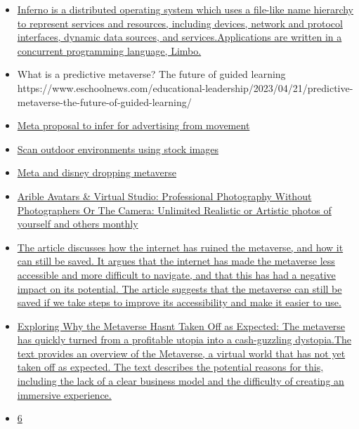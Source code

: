 \begin{itemize}
\item
  \href{https://github.com/inferno-os/inferno-os}{Inferno is a
  distributed operating system which uses a file-like name hierarchy to
  represent services and resources, including devices, network and
  protocol interfaces, dynamic data sources, and services.Applications
  are written in a concurrent programming language, Limbo.}
\item
  What is a predictive metaverse? The future of guided learning
  https://www.eschoolnews.com/educational-leadership/2023/04/21/predictive-metaverse-the-future-of-guided-learning/
\item
  \href{https://www.reddit.com/r/virtualreality/comments/12rro32/meta_ai_proposed_an_algorithmbased_arvr_body/}{Meta
  proposal to infer for advertising from movement}
\item
  \href{https://www.reddit.com/r/vfx/comments/12ok0xe/how_to_scan_environments_for_free_without_any/}{Scan
  outdoor environments using stock images}
\item
  \href{https://www.reddit.com/r/CryptoCurrency/comments/128hqkw/meta_microsoft_and_disney_are_reversing_their/}{Meta
  and disney dropping metaverse}
\item
  \href{https://www.arible.co/prompts}{Arible Avatars \& Virtual Studio:
  Professional Photography Without Photographers Or The Camera:
  Unlimited Realistic or Artistic photos of yourself and others monthly}
\item
  \href{https://www.wired.com/story/metaverse-ethics/}{The article
  discusses how the internet has ruined the metaverse, and how it can
  still be saved. It argues that the internet has made the metaverse
  less accessible and more difficult to navigate, and that this has had
  a negative impact on its potential. The article suggests that the
  metaverse can still be saved if we take steps to improve its
  accessibility and make it easier to use.}
\item
  \href{https://www.bbntimes.com/technology/exploring-why-the-metaverse-hasn-t-taken-off-as-expected}{Exploring
  Why the Metaverse Hasn\textquotesingle t Taken Off as Expected: The
  metaverse has quickly turned from a profitable utopia into a
  cash-guzzling dystopia.The text provides an overview of the Metaverse,
  a virtual world that has not yet taken off as expected. The text
  describes the potential reasons for this, including the lack of a
  clear business model and the difficulty of creating an immersive
  experience.}
\item
  \href{https://www.reddit.com/r/virtualreality/comments/12lpsvf/rumor_meta_quest_had_more_than_6_million_monthly/}{6
}
\end{itemize}
